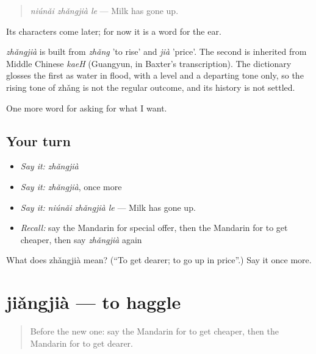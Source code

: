 \begin{quote}
\emph{niúnǎi zhǎngjià le} — Milk has gone up.
\end{quote}

Its characters come later; for now it is a word for the ear.

\begin{cousinweb}
\emph{zhǎngjià} is built from \emph{zhǎng} 'to rise' and \emph{jià} 'price'. The second is inherited from Middle Chinese \emph{kaeH} (Guangyun, in Baxter's transcription). The dictionary glosses the first as water in flood, with a level and a departing tone only, so the rising tone of zhǎng is not the regular outcome, and its history is not settled.
\end{cousinweb}

\begin{grammarlens}[title={What you've built}]
One more word for asking for what I want.
\end{grammarlens}

\subsection*{Your turn}
\begin{itemize}
\raggedright
  \item \emph{Say it:} \emph{zhǎngjià}
  \item \emph{Say it:} \emph{zhǎngjià}, once more
  \item \emph{Say it:} \emph{niúnǎi zhǎngjià le} — Milk has gone up.
  \item \emph{Recall:} say the Mandarin for special offer, then the Mandarin for to get cheaper, then say \emph{zhǎngjià} again
\end{itemize}

\begin{tcolorbox}[breakable,colback=teal!4,colframe=teal!35!black,title={Before you move on}]
What does zhǎngjià mean? (\textquotedblleft{}To get dearer; to go up in price\textquotedblright{}.) Say it once more.
\end{tcolorbox}
\section[jiǎngjià]{jiǎngjià — to haggle}

\label{lesson:ZH-C193-jiangjia-haggle}



\begin{quote}
Before the new one: say the Mandarin for to get cheaper, then the Mandarin for to get dearer.
\end{quote}

